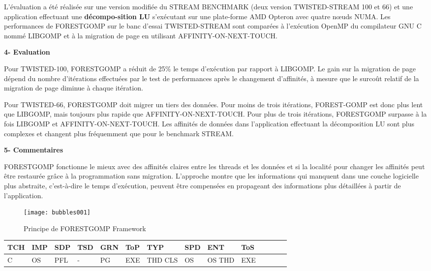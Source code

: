 L'évaluation a été réalisée sur une version modifiée du STREAM BENCHMARK (deux version TWISTED-STREAM 100 et 66) et une application effectuant une \textbf{décompo-sition LU} s'exécutant sur une plate-forme AMD Opteron avec quatre nœuds NUMA. 
Les performances de FORESTGOMP sur le banc d'essai TWISTED-STREAM sont comparées à l'exécution OpenMP du compilateur GNU C nommé LIBGOMP et à la migration de page en utilisant AFFINITY-ON-NEXT-TOUCH. 

\textbf{4- Evaluation}

Pour TWISTED-100, FORESTGOMP a réduit de 25\% le temps d'exécution par rapport à LIBGOMP. 
Le gain sur la migration de page dépend du nombre d'itérations effectuées par le test de performances après le changement d'affinités, à mesure que le surcoût relatif de la migration de page diminue à chaque itération. 

Pour TWISTED-66, FORESTGOMP doit migrer un tiers des données. Pour moins de trois itérations, FOREST-GOMP est donc plus lent que LIBGOMP, mais toujours plus rapide que AFFINITY-ON-NEXT-TOUCH. 
Pour plus de trois itérations, FORESTGOMP surpasse à la fois LIBGOMP et AFFINITY-ON-NEXT-TOUCH. 
Les affinités de données dans l'application effectuant la décomposition LU sont plus complexes et changent plus fréquemment que pour le benchmark STREAM.

\textbf{5- Commentaires}

FORESTGOMP fonctionne le mieux avec des affinités claires entre les threads et les données et si la localité pour changer les affinités peut être restaurée grâce à la programmation sans migration. 
L'approche montre que les informations qui manquent dans une couche logicielle plus abstraite, c'est-à-dire le temps d'exécution, peuvent être compensées en propageant des informations plus détaillées à partir de l'application.
%
\begin{figure}[h]
\texttt{[image: bubbles001]}
\centering
\caption{Principe de FORESTGOMP Framework}
\label{fig:mci7}
\end{figure}
%
\begin{center}%
\begin{tabular}{l *{13}{l}} 		\hline
{TCH} & {IMP} 	& {SDP} 	&  {TSD} 	& {GRN} 	& {ToP} 	& {TYP} 	& {SPD}	& {ENT} 	& {ToS} \\     		\hline
C     	& OS		& PFL		&  - 		& PG		& EXE		& THD CLS	& OS 		& OS THD  & EXE  \\     		          \hline
\end{tabular}
\end{center}
%
